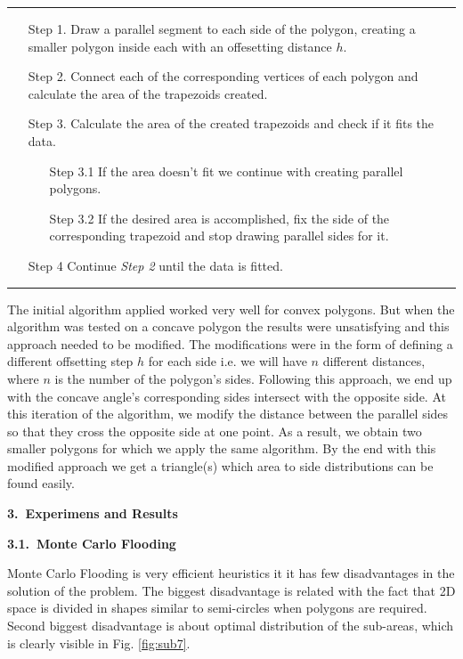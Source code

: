 \documentclass[11pt,leqno]{book}
\newcommand{\sect}[1]{\vskip7mm\par{\large \bf #1}}
\newcommand{\subsect}[1]{\vskip 3mm\par{\bf#1}}
\begin{document}
\noindent\rule{\textwidth}{1pt}
\begin{itemize}

\item[Step 1.] Draw a parallel segment to each side of the polygon, creating a smaller polygon inside each with an offesetting distance $h$. 
\item[Step 2.] Connect each of the corresponding vertices of each polygon and calculate the area of the trapezoids created.
\item[Step 3.] Calculate the area of the created trapezoids and check if it fits the data.
\begin{itemize}
\item[Step 3.1] If the area doesn't fit we continue with creating parallel polygons.
\item[Step 3.2] If the desired area is accomplished, fix the side of the corresponding trapezoid and stop drawing parallel sides for it.
\end{itemize}
  \item[Step 4] Continue \textit{Step 2} until the data is fitted.
\end{itemize}
\noindent\rule{\textwidth}{1pt}

The initial algorithm applied worked very well for convex polygons. But when the algorithm was tested on a concave polygon the results were unsatisfying and this approach needed to be modified. The modifications were in the form of defining a different offsetting step $h$ for each side i.e. we will have $n$ different distances, where $n$ is the number of the polygon's sides. Following this approach, we end up with the concave angle's corresponding sides intersect with the opposite side. At this iteration of the algorithm, we modify the distance between the parallel sides so that they cross the opposite side at one point. As a result, we obtain two smaller polygons for which we apply the same algorithm. By the end with this modified approach we get a triangle(s) which area to side distributions can be found easily.

\sect{3.~Experimens and Results}

\subsect{3.1.~Monte Carlo Flooding}

Monte Carlo Flooding is very efficient heuristics it it has few disadvantages in the solution of the problem. The biggest disadvantage is related with the fact that 2D space is divided in shapes similar to semi-circles when polygons are required. Second biggest disadvantage is about optimal distribution of the sub-areas, which is clearly visible in Fig. \ref{fig:sub7}. 
\end{document}

